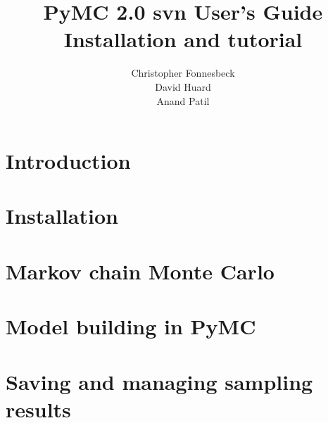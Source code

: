 \documentclass[]{manual}
\title{PyMC 2.0 svn User's Guide \\
Installation and tutorial}
\author{ Christopher Fonnesbeck\\ David Huard \\ Anand Patil }
\begin{document}
\maketitle

\tableofcontents

\chapter{Introduction} %
\label{chap:intro} 


\chapter{Installation} %
\label{chap:install} 


\chapter{Markov chain Monte Carlo} %
\label{chap:MCMC} 


\chapter{Model building in PyMC} %
\label{chap:modelbuilding} 


% 

\chapter{Saving and managing sampling results} %
\label{chap:database} 




\end{document}

